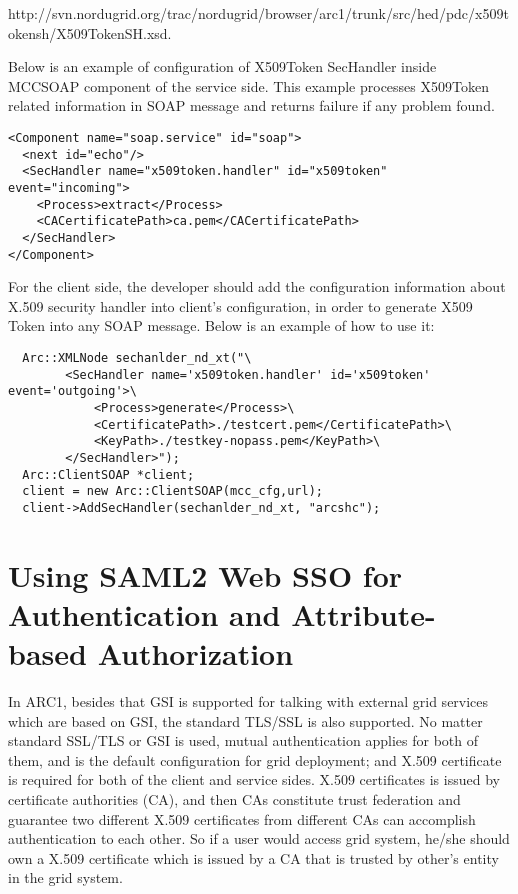 \documentclass{book}
\begin{document}
http://svn.nordugrid.org/trac/nordugrid/browser/arc1/trunk/src/hed/pdc/x509tokensh/X509TokenSH.xsd.

Below is an example of configuration of X509Token SecHandler inside MCCSOAP component of the service side. This example processes X509Token related information in SOAP message and returns failure if any problem found.

\begin{verbatim}
<Component name="soap.service" id="soap">
  <next id="echo"/>
  <SecHandler name="x509token.handler" id="x509token" event="incoming">
    <Process>extract</Process>
    <CACertificatePath>ca.pem</CACertificatePath>
  </SecHandler>
</Component>
\end{verbatim}

For the client side, the developer should add the configuration information about X.509 security handler into client's configuration, in order to generate X509 Token into any SOAP message. Below is an example of how to use it:

\begin{verbatim}
  Arc::XMLNode sechanlder_nd_xt("\ 
        <SecHandler name='x509token.handler' id='x509token' event='outgoing'>\ 
            <Process>generate</Process>\ 
            <CertificatePath>./testcert.pem</CertificatePath>\ 
            <KeyPath>./testkey-nopass.pem</KeyPath>\ 
        </SecHandler>"); 
  Arc::ClientSOAP *client; 
  client = new Arc::ClientSOAP(mcc_cfg,url); 
  client->AddSecHandler(sechanlder_nd_xt, "arcshc");
\end{verbatim}




\section{Using SAML2 Web SSO for Authentication and Attribute-based Authorization} %
\label{sec:samlsso}
   In ARC1, besides that GSI is supported for talking with external grid services which are based on GSI, the standard TLS/SSL is also supported. No matter standard SSL/TLS or GSI is used, mutual authentication applies for both of them, and is the default configuration for grid deployment; and X.509 certificate is required for both of the client and service sides. X.509 certificates is issued by certificate authorities (CA), and then CAs constitute trust federation and guarantee two different X.509 certificates from different CAs can accomplish authentication to each other. So if a user would access grid system, he/she should own a X.509 certificate which is issued by a CA that is trusted by other's entity in the grid system.
\end{document}
